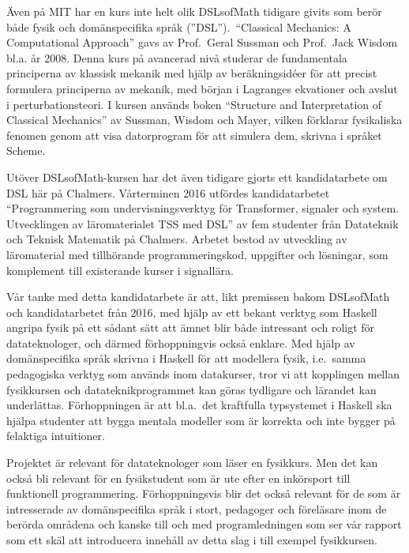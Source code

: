 \documentclass[12pt,a4paper]{article}
\begin{document}
Även på MIT har en kurs inte helt olik DSLsofMath tidigare givits som berör både
fysik och domänspecifika språk (''DSL'').\ ``Classical Mechanics: A Computational Approach'' gavs av
Prof.\ Geral Sussman och Prof.\ Jack Wisdom bl.a. år
2008.\cite{classical-mechanics-course-mit-2008}
Denna kurs på avancerad nivå studerar de fundamentala principerna av klassisk
mekanik med hjälp av beräkningsidéer för att precist formulera principerna av
mekanik, med början i Lagranges ekvationer och avslut i
perturbationsteori. I kursen används boken ``Structure and
Interpretation of Classical Mechanics'' av Sussman, Wisdom och Mayer,
vilken förklarar fysikaliska fenomen genom att visa datorprogram för att
simulera dem, skrivna i språket Scheme.\cite{SICM}

Utöver DSLsofMath-kursen har det även tidigare gjorts ett kandidatarbete om DSL 
här på Chalmers. Vårterminen 2016 utfördes kandidatarbetet
``Programmering som undervisningsverktyg för Transformer, signaler och
system. Utvecklingen av läromaterialet TSS med DSL'' av fem studenter
från Datateknik och Teknisk Matematik på Chalmers. Arbetet bestod av
utveckling av läromaterial med tillhörande programmeringskod,
uppgifter och lösningar, som komplement till existerande kurser i
signallära.\cite{kandidat2016}

Vår tanke med detta kandidatarbete är att, likt premissen bakom DSLsofMath
och kandidatarbetet från 2016, med hjälp av ett bekant verktyg
som Haskell angripa fysik på ett sådant sätt att ämnet blir både
intressant och roligt för datateknologer, och därmed förhoppningvis
också enklare. Med hjälp av domänspecifika språk skrivna i Haskell för att
modellera fysik, i.e.\ samma pedagogiska verktyg som används inom
datakurser, tror vi att kopplingen mellan fysikkursen och
datateknikprogrammet kan göras tydligare och lärandet kan underlättas.
Förhoppningen är att bl.a.\ det kraftfulla typsystemet i Haskell ska
hjälpa studenter att bygga mentala modeller som är korrekta och inte
bygger på felaktiga intuitioner.

Projektet är relevant för datateknologer som läser en fysikkurs. Men
det kan också bli relevant för en fysikstudent som är ute efter en
inkörsport till funktionell programmering. Förhoppningsvis blir det
också relevant för de som är intresserade av domänspecifika språk i
stort, pedagoger och föreläsare inom de berörda områdena och kanske
till och med programledningen som ser vår rapport som ett skäl att
introducera innehåll av detta slag i till exempel fysikkursen.
\end{document}
